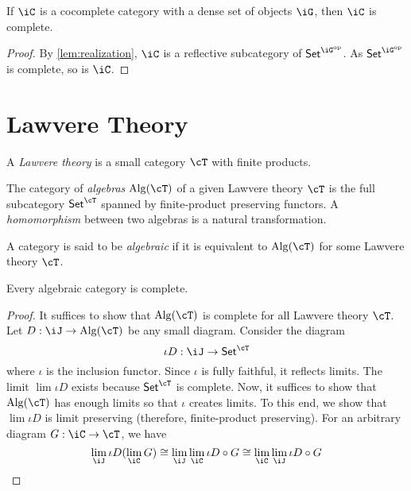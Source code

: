 \documentclass{zett}
\begin{document}
\begin{cor}
  If $\iC$ is a cocomplete category with a dense set of objects $\iG$, then $\iC$ is complete.
\end{cor}
\begin{proof}
  By \cref{lem:realization}, $\iC$ is a reflective subcategory of $\CSet^{\iG\op}$.
  As $\CSet^{\iG\op}$ is complete, so is $\iC$.
\end{proof}

\section{Lawvere Theory}
\label{sec:lawvere-theory}

\begin{defn}
  A \emph{Lawvere theory} is a small category $\cT$ with finite products.
\end{defn}

\begin{defn}
  The category of \emph{algebras} $\Alg(\cT)$ of a given Lawvere theory $\cT$ is the full subcategory $\CSet^{\cT}$ spanned by finite-product preserving functors.
  A \emph{homomorphism} between two algebras is a natural transformation.
\end{defn}

\begin{defn}
  A category is said to be \emph{algebraic} if it is equivalent to $\Alg(\cT)$ for some Lawvere theory $\cT$.
\end{defn}

\begin{thm}
  Every algebraic category is complete.
\end{thm}
\begin{proof}
  It suffices to show that $\Alg(\cT)$ is complete for all Lawvere theory $\cT$.
  Let $D : \iJ \to \Alg(\cT)$ be any small diagram.
  Consider the diagram
  \[
    \iota D : \iJ \to \CSet^{\cT}
  \]
  where $\iota$ is the inclusion functor.
  Since $\iota$ is fully faithful, it reflects limits.
  The limit $\lim \iota D$ exists because $\CSet^{\cT}$ is complete.
  Now, it suffices to show that $\Alg(\cT)$ has enough limits so that $\iota$ creates limits.
  To this end, we show that $\lim \iota D$ is limit preserving (therefore, finite-product preserving).
  For an arbitrary diagram $G : \iC \to \cT$, we have
  \[
    \lim_{\iJ} \iota D(\lim_{\iC}G) \iso \lim_{\iJ}\lim_{\iC}\iota D \circ G \iso \lim_{\iC}\lim_{\iJ}\iota D \circ G
  \]
\end{proof}
\end{document}
